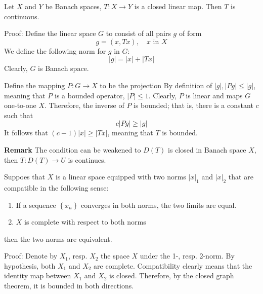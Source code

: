 \documentclass[12pt, oneside]{book}
\begin{document}
\begin{theorem}
    Let $X$ and $Y$ be Banach spaces, $T: X \rightarrow Y$ is a closed linear map.
    Then $T$ is continuous.

    Proof:
    Define the linear space $G$ to consist of all pairs $g$ of form
    \begin{equation*}
        g
        =
        \left(x, T x\right), \quad x \text { in } X
    \end{equation*}
    We define the following norm for $g$ in $G$:
    \begin{equation*}
        |g|=|x|+|T x|
    \end{equation*}
    Clearly, $G$ is Banach space.

    Define the mapping $ {P}: G \rightarrow X$ to be the projection
    By definition of $|g|,| {P} g| \leq|g|$, meaning that $ {P}$ is a bounded operator, $| {P}| \leq 1$. Clearly, $ {P}$ is linear and maps $G$ one-to-one $X$.
    Therefore, the inverse of $ {P}$ is bounded; that is, there is a constant $c$ such that
    \begin{equation*}
        c| {P} g| \geq \left|g\right|
    \end{equation*}
    It follows that $(c-1)|x| \geq|T x|$, meaning that $T$ is bounded.

    \textbf{Remark} The condition can be weakened to $D(T)$ is closed in Banach space $X$, then $T : D(T)\rightarrow U$ is continues.
\end{theorem}
\begin{theorem}
    Suppoes that $X$ is a linear space equipped with two norms $|x|_1$ and $|x|_2$ that are compatible in the following sense:

    \begin{enumerate}
        \item[(a)]  If a sequence $\left\{x_n\right\}$ converges in both norms, the two limits are equal.

        \item[(b)] $X$ is complete with respect to both norms
    \end{enumerate}
    then the two norms are equivalent.

    Proof:
    Denote by $X_1$, resp. $X_2$ the space $X$ under the 1-, resp. 2-norm. By hypothesis, both $X_1$ and $X_2$ are complete. Compatibility clearly means that the identity map between $X_1$ and $X_2$ is closed. Therefore, by the closed graph theorem, it is bounded in both directions.
\end{theorem}
\end{document}
